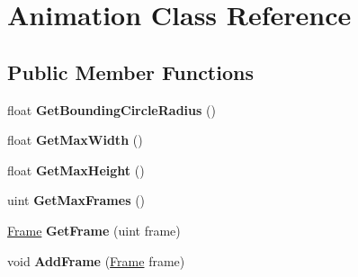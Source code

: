 \hypertarget{classAnimation}{
\section{Animation Class Reference}
\label{classAnimation}
}
\subsection*{Public Member Functions}
\begin{DoxyCompactItemize}
\item 
\hypertarget{classAnimation_a77d2891134191af5c8d8fd35fa742b4f}{
float {\bfseries GetBoundingCircleRadius} ()}
\label{classAnimation_a77d2891134191af5c8d8fd35fa742b4f}

\item 
\hypertarget{classAnimation_a3e75ca6a1beef8fdf924b0d435cfcfbf}{
float {\bfseries GetMaxWidth} ()}
\label{classAnimation_a3e75ca6a1beef8fdf924b0d435cfcfbf}

\item 
\hypertarget{classAnimation_ad0abdb05ae1431f4d7dc49961e92aa31}{
float {\bfseries GetMaxHeight} ()}
\label{classAnimation_ad0abdb05ae1431f4d7dc49961e92aa31}

\item 
\hypertarget{classAnimation_ace7d5bbace38ca657febda64b6719cf1}{
uint {\bfseries GetMaxFrames} ()}
\label{classAnimation_ace7d5bbace38ca657febda64b6719cf1}

\item 
\hypertarget{classAnimation_aae68f764cf4db8b1b351b119b52118f1}{
\hyperlink{structFrame}{Frame} {\bfseries GetFrame} (uint frame)}
\label{classAnimation_aae68f764cf4db8b1b351b119b52118f1}

\item 
\hypertarget{classAnimation_a3180af821a78a493fb4347bce1ee676c}{
void {\bfseries AddFrame} (\hyperlink{structFrame}{Frame} frame)}
\label{classAnimation_a3180af821a78a493fb4347bce1ee676c}

\end{DoxyCompactItemize}
